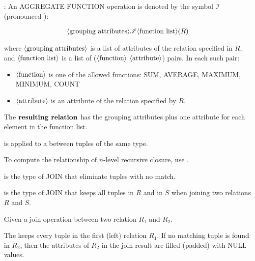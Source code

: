       \par {}: An AGGREGATE FUNCTION operation is denoted by the symbol $\mathcal{I}$ (pronounced ):

      \begin{align*}
        \langle \mbox{grouping attributes} \rangle \mathscr{I} \langle \mbox{function list} \rangle (R)
      \end{align*}

      where $\langle \mbox{grouping attributes} \rangle$ is a list of attributes of the relation specified in $R$, and $\langle \mbox{function list} \rangle$ is a list of ($\langle \mbox{function} \rangle$ $\langle \mbox{attribute} \rangle$) pairs. In each such pair:

      \begin{itemize}
        \item $\langle \mbox{function} \rangle$ is one of the allowed functions: SUM, AVERAGE, MAXIMUM, MINIMUM, COUNT
        \item $\langle \mbox{attribute} \rangle$ is an attribute of the relation specified by $R$.
      \end{itemize}

      \par The $\textbf{resulting relation}$ has the grouping attributes plus one attribute for each element in the function list.

    \par {} is applied to a  between tuples of the same type.
    \par To compute the relationship of $n$-level recursive closure, use .

      \par {} is the type of JOIN that eliminate tuples with no match.
      \par {} is the type of JOIN that keeps all tuples in $R$ and in $S$ when joining two relations $R$ and $S$.

      \par Given a join operation between two relation $R_{1}$ and $R_{2}$.

      \par The  keeps every tuple in the first (left) relation $R_1$. If no matching tuple is found in $R_2$, then the attributes of $R_2$ in the join result are filled (padded) with NULL values.

